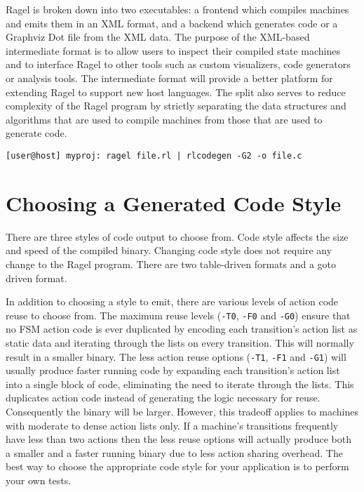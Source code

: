 \documentclass[letterpaper,11pt,oneside]{book}
\newcommand{\verbspace}{\vspace{10pt}}
\begin{document}
Ragel is broken down into two executables: a frontend which compiles machines
and emits them in an XML format, and a backend which generates code or a
Graphviz Dot file from the XML data. The purpose of the XML-based intermediate
format is to allow users to inspect their compiled state machines and to
interface Ragel to other tools such as custom visualizers, code generators or
analysis tools. The intermediate format will provide a better platform for
extending Ragel to support new host languages. The split also serves to reduce
complexity of the Ragel program by strictly separating the data structures and
algorithms that are used to compile machines from those that are used to
generate code. 

\verbspace
\begin{verbatim}
[user@host] myproj: ragel file.rl | rlcodegen -G2 -o file.c
\end{verbatim}

\section{Choosing a Generated Code Style}
\label{genout}

There are three styles of code output to choose from. Code style affects the
size and speed of the compiled binary. Changing code style does not require any
change to the Ragel program. There are two table-driven formats and a goto
driven format.

In addition to choosing a style to emit, there are various levels of action
code reuse to choose from.  The maximum reuse levels (\verb|-T0|, \verb|-F0|
and \verb|-G0|) ensure that no FSM action code is ever duplicated by encoding
each transition's action list as static data and iterating
through the lists on every transition. This will normally result in a smaller
binary. The less action reuse options (\verb|-T1|, \verb|-F1| and \verb|-G1|)
will usually produce faster running code by expanding each transition's action
list into a single block of code, eliminating the need to iterate through the
lists. This duplicates action code instead of generating the logic necessary
for reuse. Consequently the binary will be larger. However, this tradeoff applies to
machines with moderate to dense action lists only. If a machine's transitions
frequently have less than two actions then the less reuse options will actually
produce both a smaller and a faster running binary due to less action sharing
overhead. The best way to choose the appropriate code style for your
application is to perform your own tests.
\end{document}
